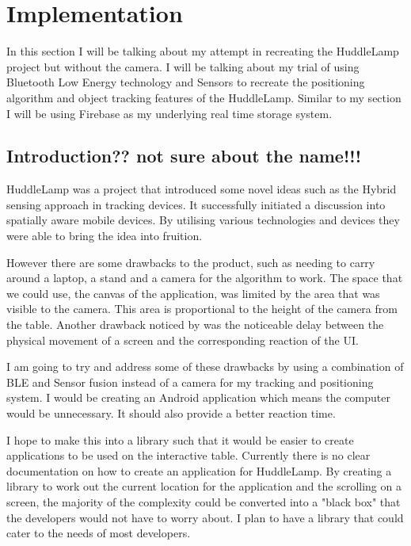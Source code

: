 \section{Implementation}

In this section I will be talking about my attempt in recreating the HuddleLamp project but without the camera. I will be talking about my trial of using Bluetooth Low Energy technology and Sensors to recreate the positioning algorithm and object tracking features of the HuddleLamp. Similar to my \nameref{} section I will be using Firebase as my underlying real time storage system.


\subsection{Introduction?? not sure about the name!!!}
HuddleLamp was a project that introduced some novel ideas such as the Hybrid sensing approach in tracking devices. It successfully initiated a discussion into spatially aware mobile devices. By utilising various technologies and devices they were able to bring the idea into fruition. 

However there are some drawbacks to the product, such as needing to carry around a laptop, a stand and a camera for the algorithm to work. The space that we could use, the canvas of the application, was limited by the area that was visible to the camera. This area is proportional to the height of the camera from the table. Another drawback noticed by \citeauthor{huddelamp-paper} was the noticeable delay between the physical movement of a screen and the corresponding reaction of the UI\cite{huddelamp-paper}. 

I am going to try and address some of these drawbacks by using a combination of BLE and Sensor fusion instead of a camera for my tracking and positioning system. I would be creating an Android application which means the computer would be unnecessary. It should also provide a better reaction time. 

I hope to make this into a library such that it would be easier to create applications to be used on the interactive table. Currently there is no clear documentation on how to create an application for HuddleLamp. By creating a library to work out the current location for the application and the scrolling on a screen, the majority of the complexity could be converted into a "black box" that the developers would not have to worry about. I plan to have a library that could cater to the needs of most developers. 

